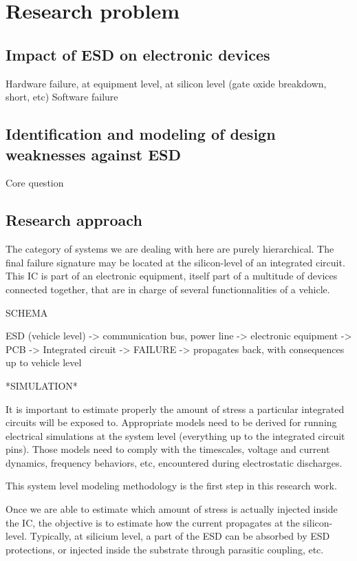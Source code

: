 \section{Research problem}
\subsection{Impact of ESD on electronic devices}

Hardware failure, at equipment level, at silicon level (gate oxide breakdown, short, etc)
Software failure

\subsection{Identification and modeling of design weaknesses against ESD}

Core question

\subsection{Research approach}

The category of systems we are dealing with here are purely hierarchical.
The final failure signature may be located at the silicon-level of an integrated circuit.
This IC is part of an electronic equipment, itself part of a multitude of devices connected together,
that are in charge of several functionnalities of a vehicle.

SCHEMA

ESD (vehicle level) -> communication bus, power line -> electronic equipment ->
PCB -> Integrated circuit -> FAILURE -> propagates back, with consequences up to vehicle level

*SIMULATION*

It is important to estimate properly the amount of stress a particular integrated circuits will be exposed to.
Appropriate models need to be derived for running electrical simulations at the system level (everything up to the integrated circuit pins).
Those models need to comply with the timescales, voltage and current dynamics, frequency behaviors, etc, encountered during electrostatic discharges.

This system level modeling methodology is the first step in this research work.

Once we are able to estimate which amount of stress is actually injected inside the IC, the objective is to estimate how the current propagates at the silicon-level.
Typically, at silicium level, a part of the ESD can be absorbed by ESD protections, or injected inside the substrate through parasitic coupling, etc.

